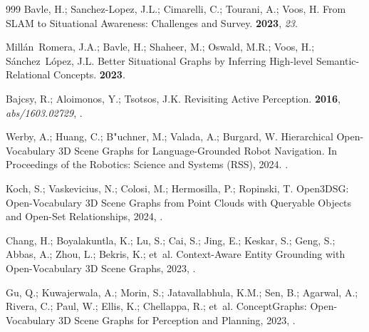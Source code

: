 \documentclass[10pt,a4paper]{article}
\begin{document}
\begin{thebibliography}{999}
Bavle, H.; Sanchez-Lopez, J.L.; Cimarelli, C.; Tourani, A.; Voos, H.
\newblock From SLAM to Situational Awareness: Challenges and Survey.
 {\bf 2023}, {\em 23}.

Millán~Romera, J.A.; Bavle, H.; Shaheer, M.; Oswald, M.R.; Voos, H.;
  Sánchez~López, J.L.
\newblock Better Situational Graphs by Inferring High-level Semantic-Relational
  Concepts.
 {\bf 2023}.

Bajcsy, R.; Aloimonos, Y.; Tsotsos, J.K.
\newblock Revisiting Active Perception.
 {\bf 2016}, {\em abs/1603.02729},
  \href{http://arxiv.org/abs/1603.02729}{{\normalfont [1603.02729]}}.

Werby, A.; Huang, C.; B{"u}chner, M.; Valada, A.; Burgard, W.
\newblock Hierarchical Open-Vocabulary {3D} Scene Graphs for Language-Grounded
  Robot Navigation.
\newblock In Proceedings of the Robotics: Science and Systems (RSS),  2024.
.

Koch, S.; Vaskevicius, N.; Colosi, M.; Hermosilla, P.; Ropinski, T.
\newblock Open3DSG: Open-Vocabulary 3D Scene Graphs from Point Clouds with
  Queryable Objects and Open-Set Relationships,  2024,
  \href{http://arxiv.org/abs/2402.12259}{{\normalfont
  [arXiv:cs.CV/2402.12259]}}.

Chang, H.; Boyalakuntla, K.; Lu, S.; Cai, S.; Jing, E.; Keskar, S.; Geng, S.;
  Abbas, A.; Zhou, L.; Bekris, K.;  et~al.
\newblock Context-Aware Entity Grounding with Open-Vocabulary 3D Scene Graphs,
  2023,  \href{http://arxiv.org/abs/2309.15940}{{\normalfont
  [arXiv:cs.RO/2309.15940]}}.

Gu, Q.; Kuwajerwala, A.; Morin, S.; Jatavallabhula, K.M.; Sen, B.; Agarwal, A.;
  Rivera, C.; Paul, W.; Ellis, K.; Chellappa, R.;  et~al.
\newblock ConceptGraphs: Open-Vocabulary 3D Scene Graphs for Perception and
  Planning,  2023,  \href{http://arxiv.org/abs/2309.16650}{{\normalfont
  [arXiv:cs.RO/2309.16650]}}.


\end{thebibliography}
\end{document}
